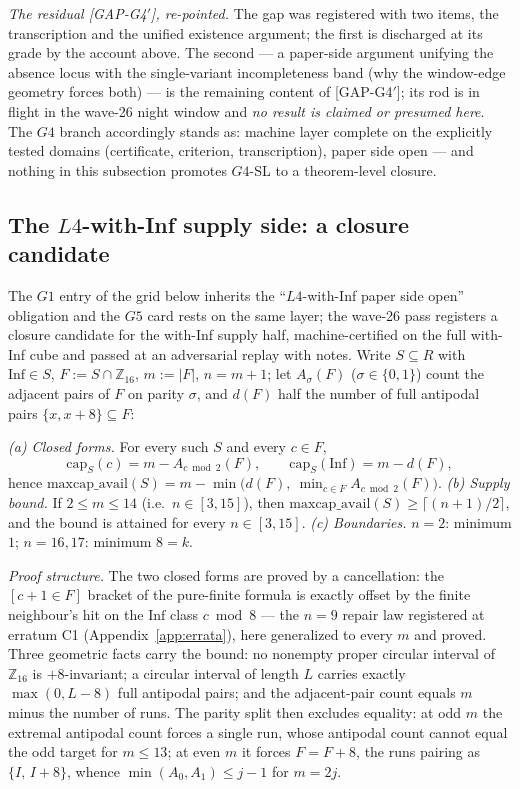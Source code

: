 \emph{The residual \textup{[GAP-G4$'$]}, re-pointed.} The gap was registered with
two items, the transcription and the unified existence argument; the first is
discharged at its grade by the account above. The second --- a paper-side argument
unifying the absence locus with the single-variant incompleteness band (why the
window-edge geometry forces both) --- is the remaining content of
\textup{[GAP-G4$'$]}; its rod is in flight in the wave-26 night window and
\emph{no result is claimed or presumed here}. The $G4$ branch accordingly stands as:
machine layer complete on the explicitly tested domains (certificate, criterion,
transcription), paper side open --- and nothing in this subsection promotes
$G4$-SL to a theorem-level closure.

\subsection{The $L4$-with-Inf supply side: a closure candidate}\label{subsec:l4inf}

The $G1$ entry of the grid below inherits the ``$L4$-with-Inf paper side open''
obligation and the $G5$ card rests on the same layer; the wave-26 pass registers a
closure candidate for the with-Inf supply half, machine-certified on the full
with-Inf cube and passed at an adversarial replay with notes. Write $S\subseteq R$
with $\mathrm{Inf}\in S$, $F:=S\cap\mathbb{Z}_{16}$, $m:=|F|$, $n=m+1$; let
$A_\sigma(F)$ ($\sigma\in\{0,1\}$) count the adjacent pairs of $F$ on parity
$\sigma$, and $d(F)$ half the number of full antipodal pairs
$\{x,x+8\}\subseteq F$:

\begin{proposition}\label{prop:l4inf}
\emph{(a) Closed forms.} For every such $S$ and every $c\in F$,
\[
\mathrm{cap}_S(c)=m-A_{c\bmod2}(F),\qquad
\mathrm{cap}_S(\mathrm{Inf})=m-d(F),
\]
hence $\mathrm{maxcap\_avail}(S)=m-\min\bigl(d(F),\ \min_{c\in F}
A_{c\bmod2}(F)\bigr)$.
\emph{(b) Supply bound.} If $2\le m\le14$ (i.e.\ $n\in[3,15]$), then
$\mathrm{maxcap\_avail}(S)\ge\lceil(n+1)/2\rceil$, and the bound is attained for
every $n\in[3,15]$.
\emph{(c) Boundaries.} $n=2$: minimum $1$; $n=16,17$: minimum $8=k$.
\end{proposition}

\emph{Proof structure.} The two closed forms are proved by a cancellation: the
$[c{+}1\in F]$ bracket of the pure-finite formula is exactly offset by the finite
neighbour's hit on the $\mathrm{Inf}$ class $c\bmod 8$ --- the $n=9$ repair law
registered at erratum C1 (Appendix~\ref{app:errata}), here generalized to every $m$
and proved. Three geometric facts carry the bound: no nonempty proper circular
interval of $\mathbb{Z}_{16}$ is $+8$-invariant; a circular interval of length $L$
carries exactly $\max(0,L-8)$ full antipodal pairs; and the adjacent-pair count
equals $m$ minus the number of runs. The parity split then excludes equality: at
odd $m$ the extremal antipodal count forces a single run, whose antipodal count
cannot equal the odd target for $m\le13$; at even $m$ it forces $F=F+8$, the runs
pairing as $\{I,\,I{+}8\}$, whence $\min(A_0,A_1)\le j-1$ for $m=2j$.

